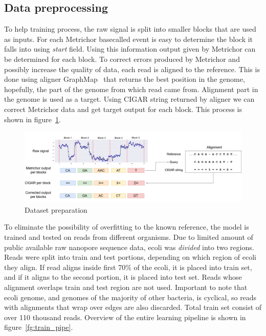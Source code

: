\documentclass[runningheads,a4paper]{llncs}
\begin{document}
\subsection{Data preprocessing}

To help training process, the raw signal is split into smaller blocks that are used as inputs. For each Metrichor basecalled event is easy to determine the block it falls into using \emph{start} field. Using this information output given by Metrichor can be determined for each block.
To correct errors produced by Metrichor and possibly increase the quality of data, each read is aligned to the reference. This is done using aligner GraphMap~\cite{sovic2016fast} that returns the best position in the genome, hopefully, the part of the genome from which read came from.
Alignment part in the genome is used as a target. Using CIGAR string returned by aligner we can correct Metrichor data and get target output for each block. This process is shown in figure~\ref{fg:data_correction}.

\begin{figure}[!ht]
	\begin{center}
		\includegraphics[width=1\textwidth]{./imgs/train_data_correction.png}
		\caption{Dataset preparation}
		\label{fg:data_correction}
	\end{center}
\end{figure}


To eliminate the possibility of overfitting to the known reference, the model is trained and tested on reads from different organisms. Due to limited amount of public available raw nanopore sequence data, ecoli was \emph{divided} into two regions.
Reads were split into train and test portions, depending on which region of ecoli they align.
If read aligns inside first 70\% of the ecoli, it is placed into train set, and if it aligns to the second portion, it is placed into test set. Reads whose alignment overlaps train and test region are not used. Important to note that ecoli genome, and genomes of the majority of other bacteria, is cyclical, so reads with alignments that wrap over edges are also discarded. Total train set consist of over 110 thousand reads.
Overview of the entire learning pipeline is shown in figure~\ref{fg:train_pipe}.
\end{document}
